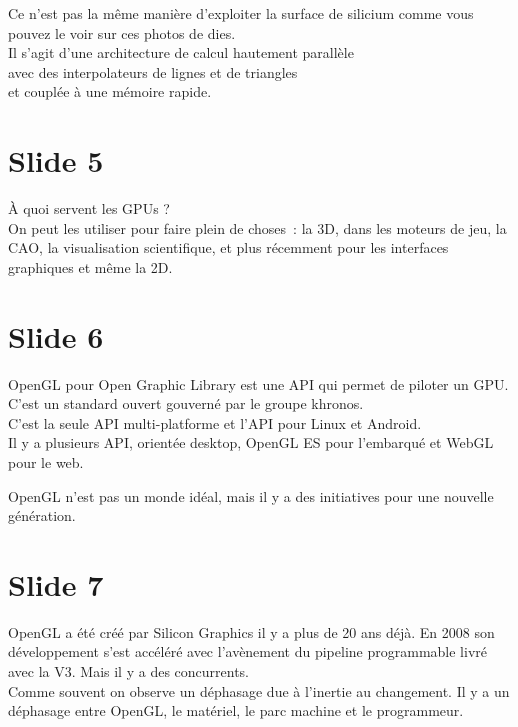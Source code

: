 \documentclass[12pt]{article}
\begin{document}
\noindent%
Ce n'est pas la même manière d'exploiter la surface de silicium comme vous pouvez le voir sur ces
photos de dies. \\

\noindent%
Il s'agit d'une architecture de calcul hautement parallèle \\
avec des interpolateurs de lignes et de triangles \\
et couplée à une mémoire rapide.

\section{Slide 5}

\noindent%
À quoi servent les GPUs ? \\

\noindent%
On peut les utiliser pour faire plein de choses~: la 3D, dans les moteurs de jeu, la CAO, la
visualisation scientifique, et plus récemment pour les interfaces graphiques et même la 2D.

\section{Slide 6}

\noindent%
OpenGL pour Open Graphic Library est une API qui permet de piloter un GPU. \\
C'est un standard ouvert gouverné par le groupe khronos.  \\
C'est la seule API multi-platforme et l'API pour Linux et Android. \\
Il y a plusieurs API, orientée desktop, OpenGL ES pour l'embarqué et WebGL pour le web.

\noindent%
OpenGL n'est pas un monde idéal, mais il y a des initiatives pour une nouvelle génération.

\section{Slide 7}

\noindent%
OpenGL a été créé par Silicon Graphics il y a plus de 20 ans déjà. En 2008 son développement s'est
accéléré avec l'avènement du pipeline programmable livré avec la V3. Mais il y a des concurrents. \\

\noindent%
Comme souvent on observe un déphasage due à l'inertie au changement. Il y a un déphasage entre
OpenGL, le matériel, le parc machine et le programmeur. \\
\end{document}
